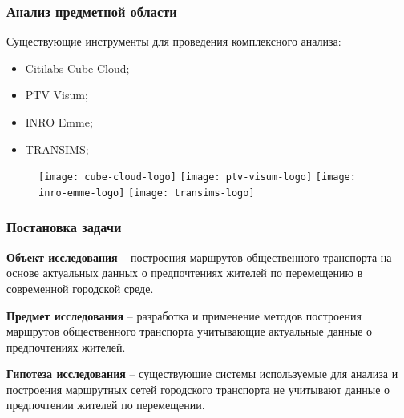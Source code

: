\begin{frame}
    \frametitle{Анализ предметной области}
    Существующие инструменты для проведения комплексного анализа:
    \begin{itemize}
        \item Citilabs Cube Cloud;
        \item PTV Visum;
        \item INRO Emme;
        \item TRANSIMS;
    \end{itemize}
    \begin{figure}
        \centering
        \texttt{[image: cube-cloud-logo]}\quad
        \texttt{[image: ptv-visum-logo]}\quad
        \texttt{[image: inro-emme-logo]}\quad
        \texttt{[image: transims-logo]}
    \end{figure}
\end{frame}

\begin{frame}
    \frametitle{Постановка задачи}
    \textbf{Объект исследования} -- построения маршрутов общественного транспорта на основе актуальных 
    данных о предпочтениях жителей по перемещению в современной городской среде.\\\vspace{1em}

    \textbf{Предмет исследования} -- разработка и применение методов построения маршрутов 
    общественного транспорта учитывающие актуальные данные о предпочтениях жителей.\\\vspace{1em}

    \textbf{Гипотеза исследования} -- существующие системы используемые для анализа и построения маршрутных 
    сетей городского транспорта не учитывают данные о предпочтении жителей по перемещении.
\end{frame}

